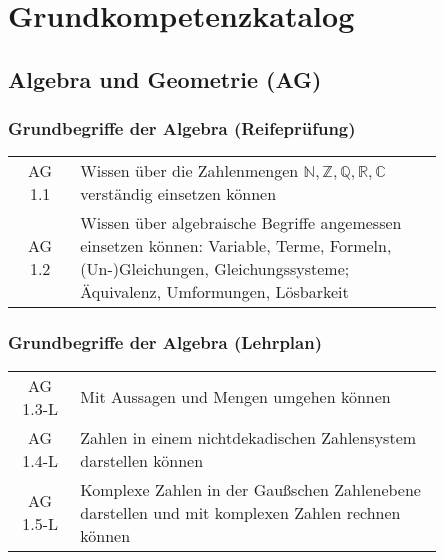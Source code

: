 \documentclass[a4paper,12pt]{article}
\begin{document}
\section{Grundkompetenzkatalog} 

\subsection{Algebra und Geometrie (AG)}

\subsubsection{Grundbegriffe der Algebra (Reifeprüfung)}

\begin{tabular}{cp{0.85\linewidth}}
AG 1.1 & Wissen über die Zahlenmengen $\mathbb{N}, \mathbb{Z}, \mathbb{Q}, \mathbb{R}, \mathbb{C}$ verständig einsetzen können \\

AG 1.2 &Wissen über algebraische Begriffe angemessen einsetzen können: Variable, Terme, Formeln, (Un-)Gleichungen, Gleichungssysteme; Äquivalenz, Umformungen, Lösbarkeit\\
\end{tabular}

%



\subsubsection{Grundbegriffe der Algebra (Lehrplan)}
\begin{em}
\begin{tabular}{cp{0.85\linewidth}}
AG 1.3-L & Mit Aussagen und Mengen umgehen können \\

AG 1.4-L & Zahlen in einem nichtdekadischen Zahlensystem darstellen können \\

AG 1.5-L & Komplexe Zahlen in der Gaußschen Zahlenebene darstellen und mit komplexen Zahlen rechnen können \\
\end{tabular}
\end{em}
\end{document}
